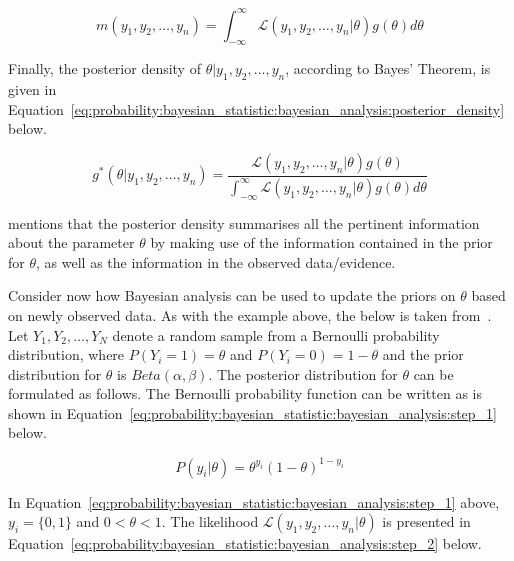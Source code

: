 \begin{equation}
      \label{eq:probability:bayesian_statistic:bayesian_analysis:marginal_density}
      m(y_{1}, y_{2}, \dots, y_{n}) = \int_{-\infty}^{\infty} \mathcal{L}(y_{1}, y_{2}, \dots, y_{n} \vert \theta)g(\theta)d\theta
\end{equation}

\noindent
Finally, the posterior density of $\theta \vert y_{1}, y_{2}, \dots, y_{n}$, according to Bayes' Theorem, is given in Equation~\eqref{eq:probability:bayesian_statistic:bayesian_analysis:posterior_density} below.

\begin{equation}
      \label{eq:probability:bayesian_statistic:bayesian_analysis:posterior_density}
      g^{*}(\theta \vert y_{1}, y_{2}, \dots, y_{n}) = \frac{\mathcal{L}(y_{1}, y_{2}, \dots, y_{n} \vert \theta)g(\theta)}{\int_{-\infty}^{\infty} \mathcal{L}(y_{1}, y_{2}, \dots, y_{n} \vert \theta)g(\theta)d\theta}
\end{equation}

\noindent
\citeauthor{ref:wackerly:2014}\cite{ref:wackerly:2014} mentions that the posterior density summarises all the pertinent information about the parameter $\theta$ by making use of the information contained in the prior for $\theta$, as well as the information in the observed data/evidence.

Consider now how Bayesian analysis can be used to update the priors on $\theta$ based on newly observed data. As with the example above, the below is taken from~\cite{ref:wackerly:2014}. Let $Y_{1}, Y_{2}, \dots, Y_{N}$ denote a random sample from a Bernoulli probability distribution, where $P(Y_{i} = 1) = \theta$ and $P(Y_{i} = 0) = 1 - \theta$ and the prior distribution for $\theta$ is $Beta(\alpha, \beta)$. The posterior distribution for $\theta$ can be formulated as follows. The Bernoulli probability function can be written as is shown in Equation~\eqref{eq:probability:bayesian_statistic:bayesian_analysis:step_1} below.

\begin{equation}
      \label{eq:probability:bayesian_statistic:bayesian_analysis:step_1}
      P(y_{i} \vert \theta) = \theta^{y_{i}}(1 - \theta)^{1-y_{i}}
\end{equation}

\noindent
In Equation~\eqref{eq:probability:bayesian_statistic:bayesian_analysis:step_1} above, $y_{i} = \{0,1\}$ and $0 < \theta < 1$. The likelihood $\mathcal{L}(y_{1}, y_{2}, \dots, y_{n} \vert \theta)$ is presented in Equation~\eqref{eq:probability:bayesian_statistic:bayesian_analysis:step_2} below.

